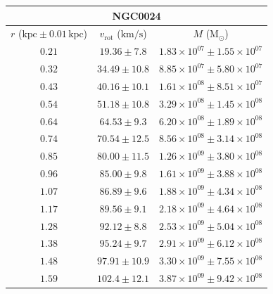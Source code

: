 \documentclass{article}
\newcommand\solmass{\textrm{M}_\odot}
\newcommand\kpc{\textrm{kpc}}
\newcommand\kmps{\textrm{km}/\textrm{s}}
\newcommand\vrot{\ensuremath{v_{\textrm{rot}}}}
\begin{document}

% 
% 


\singlespacing

\begin{table}[h!]
    \begin{tabular}{|c|c|c|}
        \hline
        \multicolumn{3}{|c|}{NGC0024} \\
        \hline
        $r$ ($\kpc \pm 0.01 \,\kpc$) & $\vrot$ ($\kmps$) & $M$ ($\solmass$) \\
        \hline
        $0.21$ & $19.36 \pm 7.8$ & $1.83\times 10^{07} \pm 1.55\times 10^{07}$ \\
        $0.32$ & $34.49 \pm 10.8$ & $8.85\times 10^{07} \pm 5.80\times 10^{07}$ \\
        $0.43$ & $40.16 \pm 10.1$ & $1.61\times 10^{08} \pm 8.51\times 10^{07}$ \\
        $0.54$ & $51.18 \pm 10.8$ & $3.29\times 10^{08} \pm 1.45\times 10^{08}$ \\
        $0.64$ & $64.53 \pm 9.3$ & $6.20\times 10^{08} \pm 1.89\times 10^{08}$ \\
        $0.74$ & $70.54 \pm 12.5$ & $8.56\times 10^{08} \pm 3.14\times 10^{08}$ \\
        $0.85$ & $80.00 \pm 11.5$ & $1.26\times 10^{09} \pm 3.80\times 10^{08}$ \\
        $0.96$ & $85.00 \pm 9.8$ & $1.61\times 10^{09} \pm 3.88\times 10^{08}$ \\
        $1.07$ & $86.89 \pm 9.6$ & $1.88\times 10^{09} \pm 4.34\times 10^{08}$ \\
        $1.17$ & $89.56 \pm 9.1$ & $2.18\times 10^{09} \pm 4.64\times 10^{08}$ \\
        $1.28$ & $92.12 \pm 8.8$ & $2.53\times 10^{09} \pm 5.04\times 10^{08}$ \\
        $1.38$ & $95.24 \pm 9.7$ & $2.91\times 10^{09} \pm 6.12\times 10^{08}$ \\
        $1.48$ & $97.91 \pm 10.9$ & $3.30\times 10^{09} \pm 7.55\times 10^{08}$ \\
        $1.59$ & $102.4 \pm 12.1$ & $3.87\times 10^{09} \pm 9.42\times 10^{08}$ \\

\end{tabular}
\end{table}
\end{document}
